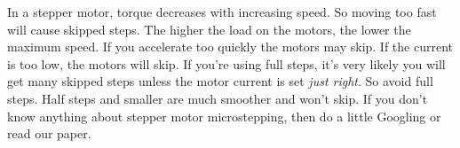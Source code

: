 \documentclass[11pt]{report} %
\begin{document}
In a stepper motor, torque decreases with increasing speed. So moving too fast will cause skipped steps. The higher the load on the motors, the lower the maximum speed. If you accelerate too quickly the motors may skip. If the current is too low, the motors will skip. If you're using full steps, it's very likely you will get many skipped steps unless the motor current is set \textit{just right}. So avoid full steps. Half steps and smaller are much smoother and won't skip. If you don't know anything about stepper motor microstepping, then do a little Googling or read our paper.
\end{document}
